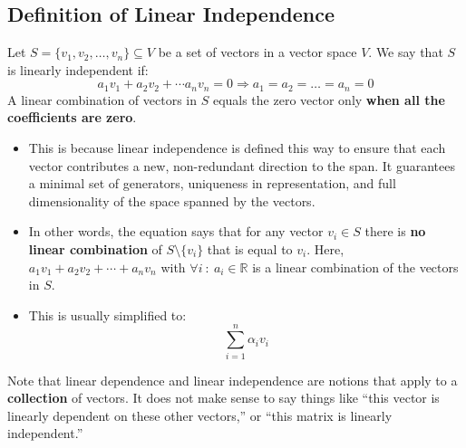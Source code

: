 \documentclass[10pt]{article}
\begin{document}
\subsection*{Definition of Linear Independence}
Let $S = \{v_1, v_2, \dots, v_n\} \subseteq V$ be a set of vectors in a vector space $V$.  We say that $S$ is linearly independent if:
\[a_1 v_1 + a_2 v_2 + \cdots a_n v_n = 0 \Rightarrow a_1 = a_2 = \dots = a_n = 0\]
A linear combination of vectors in $S$ equals the zero vector only \textbf{when all the coefficients are zero}.
\begin{itemize}
	\item This is because linear independence is defined this way to ensure that each vector contributes a new, non-redundant direction to the span.  It guarantees a minimal set of generators, uniqueness in representation, and full dimensionality of the space spanned by the vectors.
	\item In other words, the equation says that for any vector $v_i \in S$ there is \textbf{no linear combination} of $S \setminus \{v_i\}$ that is equal to $v_i$.  Here, $a_1 v_1 + a_2 v_2 + \cdots + a_n v_n$ with $\forall i \::\: a_i \in \mathbb{R}$ is a linear combination of the vectors in $S$.
	\item This is usually simplified to:
	\[\sum_{i = 1}^n \alpha_i v_i\]
\end{itemize}
Note that linear dependence and linear independence are notions that apply to a \textbf{collection} of vectors.  It does not make sense to say things like ``this vector is linearly dependent on these other vectors,'' or ``this matrix is linearly independent.''
\end{document}
